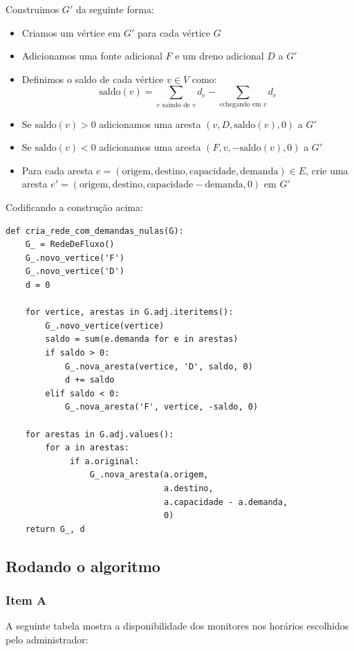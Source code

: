 \documentclass[11pt]{article}
\begin{document}
Construimos $G'$ da seguinte forma:

\begin{itemize}
\item Criamos um vértice em $G'$ para cada vértice $G$
\item Adicionamos uma fonte adicional $F$ e um dreno adicional $D$ a $G'$
\item Definimos o saldo de cada vértice $v \in V$ como: \[
  \textrm{saldo}(v) = \sum_{e \text{ saindo de }v}d_e - \sum_{e \text{
  chegando em }v}d_e \]
\item Se $\mathrm{saldo}(v) > 0$ adicionamos uma aresta $(v, D,
  \mathrm{saldo}(v), 0)$ a $G'$
\item Se $\mathrm{saldo}(v) < 0$ adicionamos uma aresta $(F, v,
  -\mathrm{saldo}(v), 0)$ a $G'$
\item Para cada aresta $e = (\mathrm{origem, destino, capacidade,
  demanda}) \in E$, crie uma aresta $e' = (\mathrm{origem, destino,
  capacidade - demanda, 0})$ em $G'$
\end{itemize}

Codificando a construção acima:
\begin{verbatim}
def cria_rede_com_demandas_nulas(G):
    G_ = RedeDeFluxo()
    G_.novo_vertice('F')
    G_.novo_vertice('D')
    d = 0

    for vertice, arestas in G.adj.iteritems():
        G_.novo_vertice(vertice)
        saldo = sum(e.demanda for e in arestas)
        if saldo > 0:
            G_.nova_aresta(vertice, 'D', saldo, 0)
            d += saldo
        elif saldo < 0:
            G_.nova_aresta('F', vertice, -saldo, 0)

    for arestas in G.adj.values():
        for a in arestas:
             if a.original:
                 G_.nova_aresta(a.origem,
                                a.destino,
                                a.capacidade - a.demanda,
                                0)
    return G_, d
\end{verbatim}

\subsection{Rodando o algoritmo}
\label{sec-2-5}

\subsubsection{Item A}
\label{sec-2-5-1}
A seguinte tabela mostra a disponibilidade dos monitores nos horários
escolhidos pelo administrador:
\end{document}
